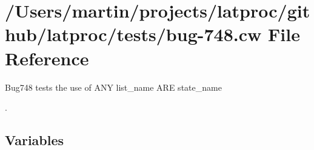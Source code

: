 \hypertarget{bug-748_8cw}{}\section{/\+Users/martin/projects/latproc/github/latproc/tests/bug-\/748.cw File Reference}
\label{bug-748_8cw}


Bug748 tests the use of A\+N\+Y list\+\_\+name A\+R\+E state\+\_\+name 
\begin{DoxyVerbInclude}
\end{DoxyVerbInclude}
.  


\subsection*{Variables}
